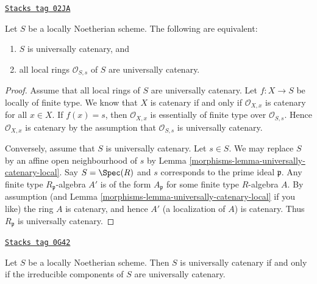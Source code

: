 \begin{lemma}
\label{morphisms-lemma-universally-catenary-local-rings-universally-catenary}
\href{https://stacks.math.columbia.edu/tag/02JA}{\texttt{Stacks tag 02JA}}

Let $S$ be a locally Noetherian scheme.
The following are equivalent:
\begin{enumerate}
\item $S$ is universally catenary, and
\item all local rings $\mathcal{O}_{S, s}$ of $S$ are universally catenary.
\end{enumerate}
\end{lemma}

\begin{proof}

Assume that all local rings of $S$ are universally catenary.
Let $f : X \to S$ be locally of finite type.
We know that $X$ is catenary if and only if $\mathcal{O}_{X, x}$ is
catenary for all $x \in X$. If $f(x) = s$, then $\mathcal{O}_{X, x}$
is essentially of finite type over $\mathcal{O}_{S, s}$. Hence
$\mathcal{O}_{X, x}$ is catenary by the assumption that
$\mathcal{O}_{S, s}$ is universally catenary.

\medskip\noindent
Conversely, assume that $S$ is universally catenary. Let $s \in S$.
We may replace $S$ by an affine open neighbourhood of $s$ by
Lemma \ref{morphisms-lemma-universally-catenary-local}. Say $S = \Spec(R)$
and $s$ corresponds to the prime ideal $\mathfrak p$. Any finite
type $R_{\mathfrak p}$-algebra $A'$ is of the form
$A_{\mathfrak p}$ for some finite type $R$-algebra $A$.
By assumption (and Lemma \ref{morphisms-lemma-universally-catenary-local} if you like)
the ring $A$ is catenary, and hence $A'$ (a localization of $A$) is
catenary. Thus $R_{\mathfrak p}$ is universally catenary.
\end{proof}

\begin{lemma}
\label{morphisms-lemma-catenary-check-irreducible}
\href{https://stacks.math.columbia.edu/tag/0G42}{\texttt{Stacks tag 0G42}}

Let $S$ be a locally Noetherian scheme. Then $S$ is universally catenary
if and only if the irreducible components of $S$ are universally catenary.
\end{lemma}

